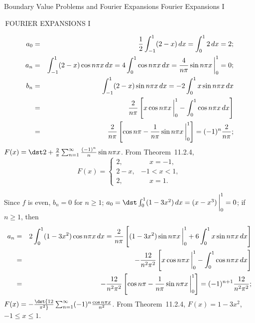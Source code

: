 \documentclass[dvips]{book}
\renewcommand{\exer}[1]{\par\medskip\;\noindent{\color{red}\bf #1.}}
\numberwithin{example}{section}
\numberwithin{equation}{section}
\numberwithin{theorem}{section}
\numberwithin{table}{section}
\numberwithin{figure}{section}
\newcommand{\lims}[2]{\,\bigg|_{#1}^{#2}}
\begin{document}
\newpage

 {Boundary Value Problems and Fourier Expansions}
{Fourier Expansions I}



\renewcommand{\thissection}{\sectiontitle
{\,FOURIER EXPANSIONS I}}
\thissection


\vspace*{-17.5pt}


\exer{11.2.2}
\begin{eqnarray*}
a_0&=&{1\over2}\int_{-1}^1(2-x)\,dx=\int_0^12\,dx=2;\\
a_n&=&\int_{-1}^1(2-x)\cos n\pi x\,dx=4\int_0^1\cos n\pi
x\,dx={4\over n\pi}\sin n\pi x\lims01=0;\\
b_n&=&\int_{-1}^1(2-x)\sin n\pi x\,dx=-2\int_0^1x\sin n\pi
x\,dx\\
&=&{2\over n\pi}\left[x\cos n\pi x\lims01-
\int_0^1\cos n\pi x\,dx\right]\\
&=&{2\over n\pi}\left[\cos n\pi-{1\over n\pi}\sin n\pi
x\lims01\right]=(-1)^n{2\over n\pi};
\end{eqnarray*}
$F(x)=\dst2+{2\over\pi}\sum_{n=1}^\infty{(-1)^n\over
n}\sin n\pi x$. From Theorem~11.2.4,
$$
F(x)=
\left\{\begin{array}{cl}
2,&\phantom{-}x=-1,\\2-x,&-1<x<1,\\2,&\phantom{-}x=1.
\end{array}\right.
$$


\exer{11.2.4}
Since $f$ is even, $b_n=0$ for $n\ge1$;
$a_0=
\dst\int_0^1(1-3x^2)\,dx=(x-x^3)\lims01=0$;
 if $n\ge1$, then
\begin{eqnarray*}
a_n&=&
2\int_0^1(1-3x^2)\cos n\pi x\,dx
={2\over n\pi}\left[(1-3x^2)\sin n\pi x\lims01
+6\int_0^1x\sin n\pi x\,dx\right]\\
&=&-{12\over n^2\pi^2}\left[x\cos n\pi x\lims01
-\int_0^1\cos n\pi x\,dx\right]\\
&=&-{12\over n^2\pi^2}\left[\cos n\pi-{1\over n\pi}
\sin n\pi x\lims01\right]=(-1)^{n+1}{12\over n^2\pi^2};
\end{eqnarray*}
$F(x)=-\dst{12\over\pi^2}\sum_{n=1}^\infty(-1)^n{\cos n\pi x\over
n^2}$.
From Theorem~11.2.4,
$F(x)=1-3x^2$,
$-1\le x\le1$.
\end{document}
